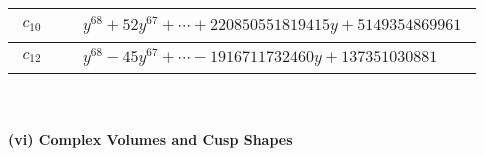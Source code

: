 \documentclass[1p]{elsarticle_modified}
\theoremstyle{definition}
\begin{document}
\begin{tabular}{m{50pt}|m{274pt}}
\hline $$\begin{aligned}c_{10}\end{aligned}$$&$\begin{aligned}
&y^{68}+52 y^{67}+\cdots+220850551819415 y+5149354869961
\end{aligned}$\\
\hline $$\begin{aligned}c_{12}\end{aligned}$$&$\begin{aligned}
&y^{68}-45 y^{67}+\cdots-1916711732460 y+137351030881
\end{aligned}$\\
\hline
\end{tabular}\\~\\
\newpage\flushleft \textbf{(vi) Complex Volumes and Cusp Shapes}
\end{document}
